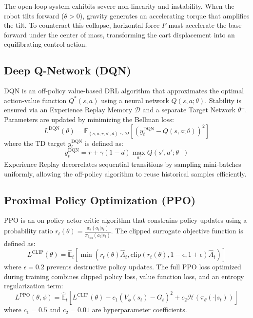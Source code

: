 \documentclass[journal,twocolumn]{IEEEtran}
\begin{document}
The open-loop system exhibits severe non-linearity and instability. When the robot tilts forward ($\theta > 0$), gravity generates an accelerating torque that amplifies the tilt. To counteract this collapse, horizontal force $F$ must accelerate the base forward under the center of mass, transforming the cart displacement into an equilibrating control action.

\subsection{Deep Q-Network (DQN)}
DQN is an off-policy value-based DRL algorithm that approximates the optimal action-value function $Q^*(s, a)$ using a neural network $Q(s, a; \theta)$. Stability is ensured via an Experience Replay Memory $\mathcal{D}$ and a separate Target Network $\theta^-$. Parameters are updated by minimizing the Bellman loss:
\begin{equation}
L^{\text{DQN}}(\theta) = \mathbb{E}_{(s,a,r,s',d) \sim \mathcal{D}} \left[ \left( y_t^{\text{DQN}} - Q(s,a;\theta) \right)^2 \right]
\end{equation}
where the TD target $y_t^{\text{DQN}}$ is defined as:
\begin{equation}
y_t^{\text{DQN}} = r + \gamma (1 - d) \max_{a'} Q(s', a'; \theta^-)
\end{equation}
Experience Replay decorrelates sequential transitions by sampling mini-batches uniformly, allowing the off-policy algorithm to reuse historical samples efficiently.

\subsection{Proximal Policy Optimization (PPO)}
PPO is an on-policy actor-critic algorithm that constrains policy updates using a probability ratio $r_t(\theta) = \frac{\pi_\theta(a_t|s_t)}{\pi_{\theta_{\text{old}}}(a_t|s_t)}$. The clipped surrogate objective function is defined as:
\begin{equation}
L^{\text{CLIP}}(\theta) = \hat{\mathbb{E}}_t \left[ \min\left( r_t(\theta)\hat{A}_t, \text{clip}(r_t(\theta), 1-\epsilon, 1+\epsilon)\hat{A}_t \right) \right]
\end{equation}
where $\epsilon = 0.2$ prevents destructive policy updates. The full PPO loss optimized during training combines clipped policy loss, value function loss, and an entropy regularization term:
\begin{equation}
L^{\text{PPO}}(\theta, \phi) = \hat{\mathbb{E}}_t \left[ L^{\text{CLIP}}(\theta) - c_1 \left(V_\phi(s_t) - G_t\right)^2 + c_2 \mathcal{H}(\pi_\theta(\cdot|s_t)) \right]
\end{equation}
where $c_1 = 0.5$ and $c_2 = 0.01$ are hyperparameter coefficients.
\end{document}
